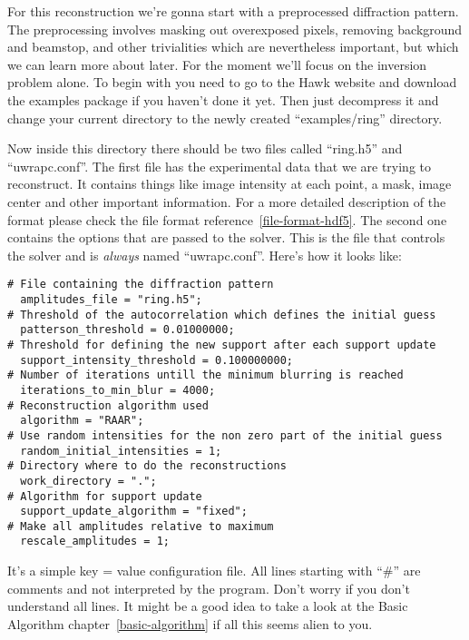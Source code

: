 \documentclass{report}
\begin{document}
For this reconstruction we're gonna start with a preprocessed diffraction pattern.
 The preprocessing involves masking out overexposed pixels, removing background and 
beamstop, and other trivialities which are nevertheless important, but which we can
 learn more about later. For the moment we'll focus on the inversion problem alone. 
To begin with you need to go to the Hawk website and download the examples package if
 you haven't done it yet. Then just decompress it and change your current directory
 to the newly created ``examples/ring'' directory.

\vspace {0.1 in}




Now inside this directory there should be two files called ``ring.h5'' and ``uwrapc.conf''.
The first file has the experimental data that we are trying to reconstruct.
It contains things like image intensity at each point, a mask, image center
and other important information. For a more detailed description of the format
please check the file format reference~\ref{file-format-hdf5}. 
The second one
contains the options that are passed to the solver. This is the file that controls
the solver and is {\em always} named ``uwrapc.conf''. Here's how it looks like:

\begin{verbatim}
# File containing the diffraction pattern
  amplitudes_file = "ring.h5";
# Threshold of the autocorrelation which defines the initial guess
  patterson_threshold = 0.01000000;
# Threshold for defining the new support after each support update
  support_intensity_threshold = 0.100000000;
# Number of iterations untill the minimum blurring is reached
  iterations_to_min_blur = 4000;
# Reconstruction algorithm used
  algorithm = "RAAR";
# Use random intensities for the non zero part of the initial guess
  random_initial_intensities = 1;
# Directory where to do the reconstructions
  work_directory = ".";
# Algorithm for support update
  support_update_algorithm = "fixed";
# Make all amplitudes relative to maximum 
  rescale_amplitudes = 1;
\end{verbatim}

It's a simple key = value configuration file. All lines starting with ``\#'' are
comments and not interpreted by the program. Don't worry if you don't understand all lines.
It might be a good idea to take a look at the Basic Algorithm chapter~\ref{basic-algorithm}
if all this seems alien to you. 
\end{document}
